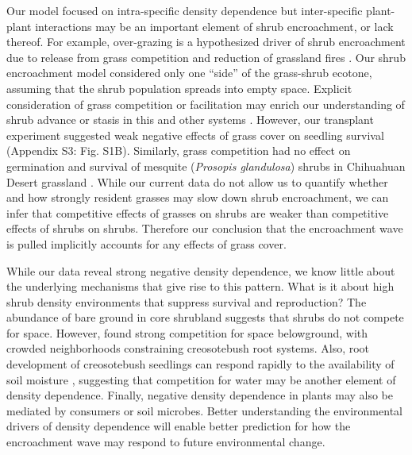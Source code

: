 \documentclass[11pt]{article}\usepackage[]{graphicx}\usepackage[usenames,dvipsnames]{xcolor}
\begin{document}
Our model focused on intra-specific density dependence but inter-specific plant-plant interactions may be an important element of shrub encroachment, or lack thereof.
For example, over-grazing is a hypothesized driver of shrub encroachment due to release from grass competition and reduction of grassland fires \citep{van2000shrub}. 
Our shrub encroachment model considered only one ``side'' of the grass-shrub ecotone, assuming that the shrub population spreads into empty space. 
Explicit consideration of grass competition or facilitation may enrich our understanding of shrub advance or stasis in this and other systems \citep{sankaran2004tree}. 
However, our transplant experiment suggested weak negative effects of grass cover on seedling survival (Appendix S3: Fig. S1B).
Similarly, grass competition had no effect on germination and survival of mesquite (\textit{Prosopis glandulosa}) shrubs in Chihuahuan Desert grassland \citep{weber2022woody}. 
While our current data do not allow us to quantify whether and how strongly resident grasses may slow down shrub encroachment, we can infer that competitive effects of grasses on shrubs are weaker than competitive effects of shrubs on shrubs.
Therefore our conclusion that the encroachment wave is pulled implicitly accounts for any effects of grass cover. 

While our data reveal strong negative density dependence, we know little about the underlying mechanisms that give rise to this pattern. 
What is it about high shrub density environments that suppress survival and reproduction?
The abundance of bare ground in core shrubland suggests that shrubs do not compete for space. 
However, \cite{brisson1994effect} found strong competition for space belowground, with crowded neighborhoods constraining creosotebush root systems. 
Also, root development of creosotebush seedlings can respond rapidly to the availability of soil moisture \citep{obrist2003increasing}, suggesting that competition for water may be another element of density dependence. 
Finally, negative density dependence in plants may also be mediated by consumers or soil microbes. 
Better understanding the environmental drivers of density dependence will enable better prediction for how the encroachment wave may respond to future environmental change.
\end{document}
